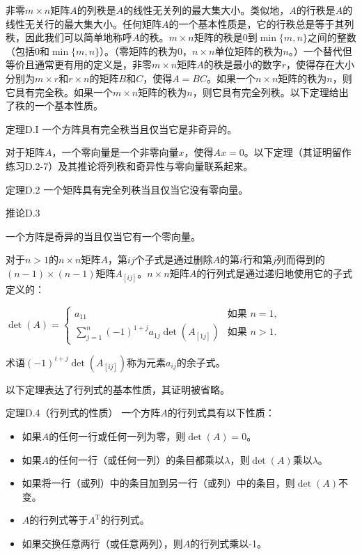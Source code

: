 \documentclass[lang=cn,newtx,10pt,scheme=chinese]{elegantbook}
\begin{document}
非零$m \times n$矩阵$A$的列秩是$A$的线性无关列的最大集大小。类似地，$A$的行秩是$A$的线性无关行的最大集大小。任何矩阵$A$的一个基本性质是，它的行秩总是等于其列秩，因此我们可以简单地称呼$A$的秩。$m \times n$矩阵的秩是0到$\min\{m,n\}$之间的整数（包括0和$\min\{m,n\}$）。（零矩阵的秩为0，$n \times n$单位矩阵的秩为$n$。）一个替代但等价且通常更有用的定义是，非零$m \times n$矩阵$A$的秩是最小的数字$r$，使得存在大小分别为$m \times r$和$r \times n$的矩阵$B$和$C$，使得$A=BC$。如果一个$n \times n$矩阵的秩为$n$，则它具有完全秩。如果一个$m \times n$矩阵的秩为$n$，则它具有完全列秩。以下定理给出了秩的一个基本性质。

定理D.I
一个方阵具有完全秩当且仅当它是非奇异的。

对于矩阵$A$，一个零向量是一个非零向量$x$，使得$Ax=0$。以下定理（其证明留作练习D.2-7）及其推论将列秩和奇异性与零向量联系起来。

定理D.2
一个矩阵具有完全列秩当且仅当它没有零向量。

推论D.3

一个方阵是奇异的当且仅当它有一个零向量。

对于$n>1$的$n \times n$矩阵$A$，第$i j$个子式是通过删除$A$的第$i$行和第$j$列而得到的$(n-1) \times(n-1)$矩阵$A_{[i j]}$。$n \times n$矩阵$A$的行列式是通过递归地使用它的子式定义的：

$\operatorname{det}(A)= \begin{cases}a_{11} & \text {如果 } n=1, \\ \sum_{j=1}^n(-1)^{1+j} a_{1 j} \operatorname{det}\left(A_{[1 j]}\right) & \text {如果 } n>1 .\end{cases}$

术语$(-1)^{i+j} \operatorname{det}\left(A_{[i j]}\right)$称为元素$a_{i j}$的余子式。

以下定理表达了行列式的基本性质，其证明被省略。

定理D.4（行列式的性质）
一个方阵$A$的行列式具有以下性质：
\begin{itemize}
\item 如果$A$的任何一行或任何一列为零，则$\operatorname{det}(A)=0$。
\item 如果$A$的任何一行（或任何一列）的条目都乘以$\lambda$，则$\operatorname{det}(A)$乘以$\lambda$。
\item 如果将一行（或列）中的条目加到另一行（或列）中的条目，则$\operatorname{det}(A)$不变。
\item $A$的行列式等于$A^{\mathrm{T}}$的行列式。
\item 如果交换任意两行（或任意两列），则$A$的行列式乘以-1。
\end{itemize}
\end{document}

